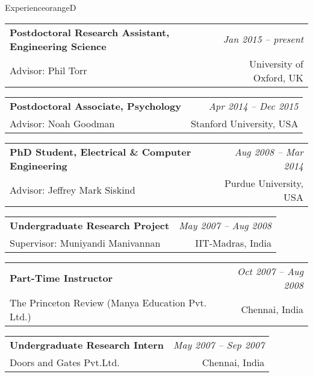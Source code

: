 \documentclass[a4paper]{article}
\makeatletter
\newlength{\itemtextwidth}
\newenvironment{position}[4]
{ \item
  \begin{tabular*}{\itemtextwidth}{@{}l@{\extracolsep{\fill}}r@{}}
    \textbf{#1} & \textit{#2} \\ #3 & \small{#4} \\
  \end{tabular*}
  \vspace*{-2pt}
} {}
\def\item{\addtocounter{enumi}{-2}\oldItem}
\makeatother
\begin{document}
\begin{region}{Experience}{orangeD}
  \begin{position} {Postdoctoral Research Assistant, Engineering Science}
    {Jan 2015 -- present}
    {Advisor: Phil Torr}
    {University of Oxford, UK}
  \end{position}
  \begin{position} {Postdoctoral Associate, Psychology}
    {Apr 2014 -- Dec 2015}
    {Advisor: Noah Goodman}
    {Stanford University, USA}
  \end{position}
  \begin{position} {PhD Student, Electrical \& Computer Engineering}
    {Aug 2008 -- Mar 2014}
    {Advisor: Jeffrey Mark Siskind}
    {Purdue University, USA}
  \end{position}
  \begin{position} {Undergraduate Research Project}
    {May 2007 -- Aug 2008}
    {Supervisor: Muniyandi Manivannan}
    {IIT-Madras, India}
  \end{position}
  \begin{position} {Part-Time Instructor}
    {Oct 2007 -- Aug 2008}
    {The Princeton Review (Manya Education Pvt. Ltd.)}
    {Chennai, India}
  \end{position}
  \begin{position} {Undergraduate Research Intern}
    {May 2007 -- Sep 2007}
    {Doors and Gates Pvt.Ltd.}
    {Chennai, India}
  \end{position}
\end{region}

\end{document}
